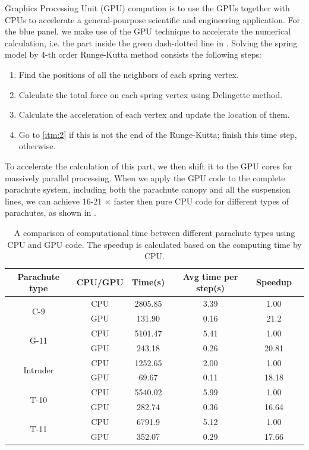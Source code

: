 Graphics Processing Unit (GPU) compution \cite{kirk2010programming} is to
use the GPUs together with CPUs to accelerate a general-pourpose scientific
and engineering application.
For the blue panel, we make use of the GPU technique to accelerate the
numerical calculation, i.e. the part inside the green dash-dotted line in
.
Solving the spring model by 4-th order Runge-Kutta method consists the
following steps:
\begin{enumerate}
\item Find the positions of all the neighbors of each spring vertex.
\item Calculate the total force on each spring vertex using Delingette method.\label{itm:2}
\item Calculate the acceleration of each vertex and update the location of
them.
\item Go to \ref{itm:2} if this is not the end of the Runge-Kutta; finish this
time step, otherwise.
\end{enumerate}
To accelerate the calculation of this part, we then shift it to the GPU
cores for massively parallel processing.
When we apply the GPU code to the complete parachute system, including both
the parachute canopy and all the suspension lines, we can achieve 16-21
$\times$ faster then pure CPU code for different types of parachutes, as
shown in .
\begin{table}
\centering
\begin{tabular}{cccccc}
\hline\hline
Parachute type & CPU/GPU & Time(s) & Avg time per step(s) & Speedup\\
\hline
\multirow{2}{*}{C-9} & CPU & 2805.85 & 3.39 & 1.00 \\
 & GPU & 131.90 & 0.16  & 21.2 \\
\hline
\multirow{2}{*}{G-11} & CPU & 5101.47 & 5.41 & 1.00 \\
 & GPU & 243.18 & 0.26 & 20.81 \\
\hline
\multirow{2}{*}{Intruder} & CPU & 1252.65 & 2.00 & 1.00 \\
 & GPU & 69.67 & 0.11 & 18.18 \\
\hline
\multirow{2}{*}{T-10} & CPU & 5540.02 & 5.99 & 1.00 \\
{} & GPU & 282.74 & 0.36 & 16.64\\
\hline
\multirow{2}{*}{T-11} & CPU & 6791.9 & 5.12 & 1.00 \\
{} & GPU & 352.07 & 0.29 & 17.66\\
\hline
\end{tabular}
\caption{A comparison of computational time between different parachute
types using CPU and GPU code. The speedup is calculated based on the
computing time by CPU.}
\label{tab:gpu_speedup}
\end{table}

